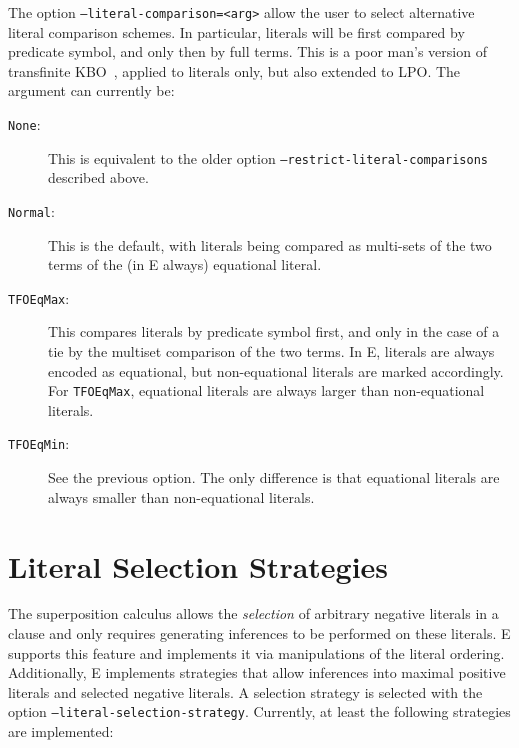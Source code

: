 \documentclass{report}
\begin{document}
The option \texttt{--literal-comparison=<arg>} allow the user to
select alternative literal comparison schemes. In particular, literals
will be first compared by predicate symbol, and only then by full
terms. This is a poor man's version of transfinite
KBO~\cite{LW:LPAR-2007,KMV:CADE-2011}, applied to literals only, but
also extended to LPO. The argument can currently be:

\begin{description}
\item[\texttt{None}:] This is equivalent to the older option
  \texttt{--restrict-literal-comparisons} described above.
\item[\texttt{Normal}:] This is the default, with literals being
  compared as multi-sets of the two terms of the (in E always)
  equational literal.
\item[\texttt{TFOEqMax}:] This compares literals by predicate symbol
  first, and only in the case of a tie by the multiset comparison of
  the two terms. In E, literals are always encoded as equational, but
  non-equational literals are marked accordingly. For
  \texttt{TFOEqMax}, equational literals are always larger than
  non-equational literals.
\item[\texttt{TFOEqMin}:] See the previous option. The only difference
  is that equational literals are always smaller than non-equational
  literals.
\end{description}


\section{Literal Selection Strategies}
\label{sec:options:strategies}

The superposition calculus allows the
\emph{selection} of arbitrary negative
literals in a clause and only requires generating inferences to be
performed on these literals. E supports this feature and implements it
via manipulations of the literal ordering. Additionally, E implements
strategies that allow inferences into maximal positive literals and
selected negative literals. A selection strategy is selected with the
option \texttt{--literal-selection-strategy}.  Currently, at least the
following strategies are implemented:
\end{document}
